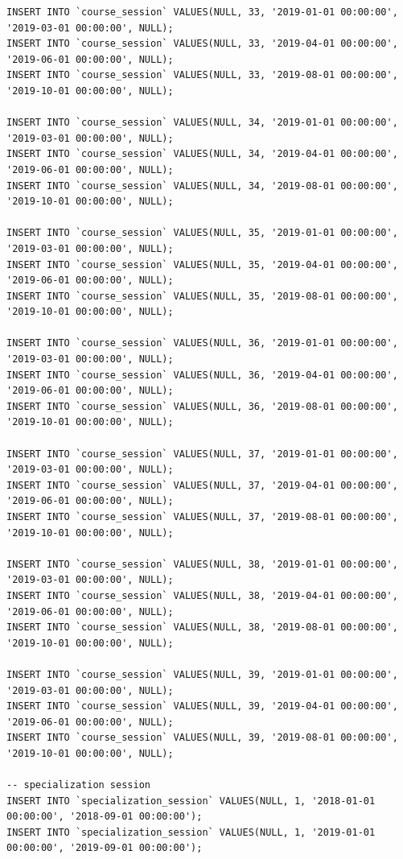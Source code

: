 \documentclass[12pt,a4paper,titlepage]{article}
\begin{document}
\begin{lstlisting}
INSERT INTO `course_session` VALUES(NULL, 33, '2019-01-01 00:00:00', '2019-03-01 00:00:00', NULL);
INSERT INTO `course_session` VALUES(NULL, 33, '2019-04-01 00:00:00', '2019-06-01 00:00:00', NULL);
INSERT INTO `course_session` VALUES(NULL, 33, '2019-08-01 00:00:00', '2019-10-01 00:00:00', NULL);

INSERT INTO `course_session` VALUES(NULL, 34, '2019-01-01 00:00:00', '2019-03-01 00:00:00', NULL);
INSERT INTO `course_session` VALUES(NULL, 34, '2019-04-01 00:00:00', '2019-06-01 00:00:00', NULL);
INSERT INTO `course_session` VALUES(NULL, 34, '2019-08-01 00:00:00', '2019-10-01 00:00:00', NULL);

INSERT INTO `course_session` VALUES(NULL, 35, '2019-01-01 00:00:00', '2019-03-01 00:00:00', NULL);
INSERT INTO `course_session` VALUES(NULL, 35, '2019-04-01 00:00:00', '2019-06-01 00:00:00', NULL);
INSERT INTO `course_session` VALUES(NULL, 35, '2019-08-01 00:00:00', '2019-10-01 00:00:00', NULL);

INSERT INTO `course_session` VALUES(NULL, 36, '2019-01-01 00:00:00', '2019-03-01 00:00:00', NULL);
INSERT INTO `course_session` VALUES(NULL, 36, '2019-04-01 00:00:00', '2019-06-01 00:00:00', NULL);
INSERT INTO `course_session` VALUES(NULL, 36, '2019-08-01 00:00:00', '2019-10-01 00:00:00', NULL);

INSERT INTO `course_session` VALUES(NULL, 37, '2019-01-01 00:00:00', '2019-03-01 00:00:00', NULL);
INSERT INTO `course_session` VALUES(NULL, 37, '2019-04-01 00:00:00', '2019-06-01 00:00:00', NULL);
INSERT INTO `course_session` VALUES(NULL, 37, '2019-08-01 00:00:00', '2019-10-01 00:00:00', NULL);

INSERT INTO `course_session` VALUES(NULL, 38, '2019-01-01 00:00:00', '2019-03-01 00:00:00', NULL);
INSERT INTO `course_session` VALUES(NULL, 38, '2019-04-01 00:00:00', '2019-06-01 00:00:00', NULL);
INSERT INTO `course_session` VALUES(NULL, 38, '2019-08-01 00:00:00', '2019-10-01 00:00:00', NULL);

INSERT INTO `course_session` VALUES(NULL, 39, '2019-01-01 00:00:00', '2019-03-01 00:00:00', NULL);
INSERT INTO `course_session` VALUES(NULL, 39, '2019-04-01 00:00:00', '2019-06-01 00:00:00', NULL);
INSERT INTO `course_session` VALUES(NULL, 39, '2019-08-01 00:00:00', '2019-10-01 00:00:00', NULL);

-- specialization session
INSERT INTO `specialization_session` VALUES(NULL, 1, '2018-01-01 00:00:00', '2018-09-01 00:00:00');
INSERT INTO `specialization_session` VALUES(NULL, 1, '2019-01-01 00:00:00', '2019-09-01 00:00:00');


\end{lstlisting}
\end{document}
